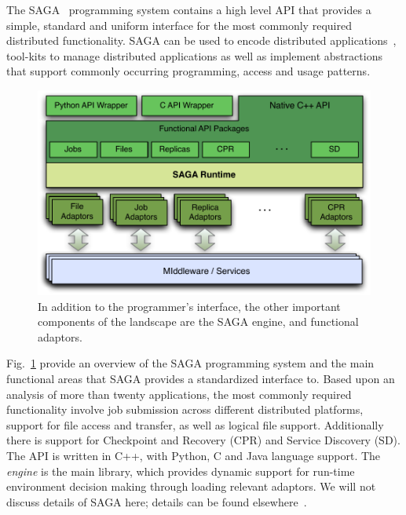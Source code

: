 \documentclass[conference,final]{IEEEtran}
\begin{document}

The SAGA~\cite{saga-core} programming system contains a high level API
that provides a simple, standard and uniform interface for the most
commonly required distributed functionality.  SAGA can be used to
encode distributed applications~\cite{saga_escience07_short,
  saga_tg08}, tool-kits to manage distributed applications as well as
implement abstractions that support commonly occurring programming,
access and usage patterns.

\begin{figure}[t]
\vspace{-2em}
\includegraphics[scale=0.5]{saga-figure02.pdf}
\caption{In addition to the programmer's interface,
  the other important components of the landscape are the SAGA engine,
  and functional adaptors.} \vspace{-3em}
\label{saga_figure}
\end{figure}

Fig.~\ref{saga_figure} provide an overview of the SAGA programming
system and the main functional areas that SAGA provides a standardized
interface to. Based upon an analysis of more than twenty applications,
the most commonly required functionality involve job submission across
different distributed platforms, support for file access and transfer,
as well as logical file support.  Additionally there is support for
Checkpoint and Recovery (CPR) and Service Discovery (SD).  The API is
written in C++, with Python, C and Java language support. The {\it
  engine} is the main library, which provides dynamic support for
run-time environment decision making through loading relevant
adaptors. We will not discuss details of SAGA here; details can be
found elsewhere~\cite{saga_url}.
\end{document}
